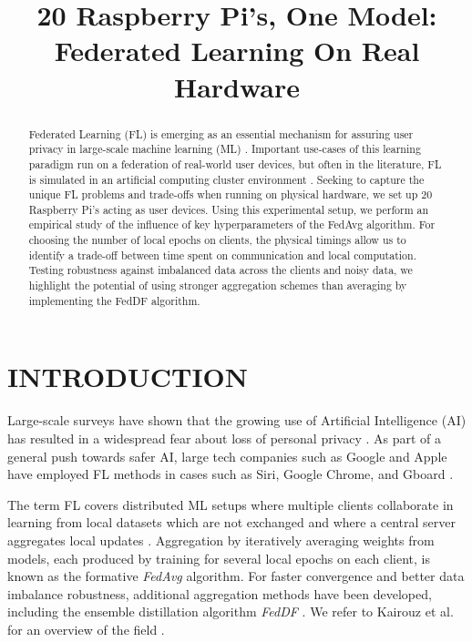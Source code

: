 \documentclass{article}
\title{20 Raspberry Pi's, One Model: Federated Learning On Real Hardware}
\begin{document}
%

\maketitle
%

\begin{abstract}
    Federated Learning (FL) is emerging as an essential mechanism for assuring user privacy in large-scale machine learning (ML) \cite{kai2021advances}.
    Important use-cases of this learning paradigm run on a federation of real-world user devices, but often in the literature, FL is simulated in an artificial computing cluster environment \cite{kai2021advances,mcmahan2017communication,lin2020ensemble}.
    Seeking to capture the unique FL problems and trade-offs when running on physical hardware, we set up 20 Raspberry Pi's acting as user devices.
    Using this experimental setup, we perform an empirical study of the influence of key hyperparameters of the FedAvg \cite{mcmahan2017communication} algorithm.
    For choosing the number of local epochs on clients, the physical timings allow us to identify a trade-off between time spent on communication and local computation.
    Testing robustness against imbalanced data across the clients and noisy data, we highlight the potential of using stronger aggregation schemes than averaging by implementing the FedDF \cite{lin2020ensemble} algorithm.
\end{abstract}

\section{INTRODUCTION}
\label{sec:intro}
Large-scale surveys have shown that the growing use of Artificial Intelligence (AI) has resulted in a widespread fear about loss of personal privacy \cite{beuc2020consumers, west2018survey}.
As part of a general push towards safer AI, large tech companies such as Google and Apple have employed FL methods in cases such as Siri, Google Chrome, and Gboard \cite{kai2021advances}.

The term FL covers distributed ML setups where multiple clients collaborate in learning from local datasets which are not exchanged and where a central server aggregates local updates \cite{kai2021advances, mcmahan2017communication}.
Aggregation by iteratively averaging weights from models, each produced by training for several local epochs on each client, is known as the formative \emph{FedAvg} \cite{mcmahan2017communication} algorithm.
For faster convergence and better data imbalance robustness, additional aggregation methods have been developed, including the ensemble distillation algorithm \emph{FedDF} \cite{lin2020ensemble}. 
We refer to Kairouz et al. for an overview of the field \cite{kai2021advances}.
\end{document}
